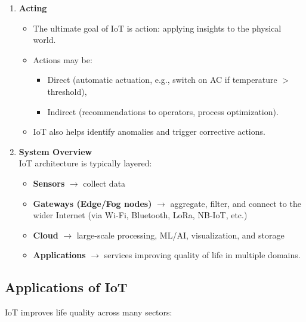 \begin{enumerate}
    \item \textbf{Acting}
    
    \begin{itemize}
        \item The ultimate goal of IoT is action: applying insights to the physical world.
        
        \item Actions may be:
        
        \begin{itemize}
            \item Direct (automatic actuation, e.g., switch on AC if temperature $>$ threshold),
            
            \item Indirect (recommendations to operators, process optimization).
        \end{itemize}
        
        \item IoT also helps identify anomalies and trigger corrective actions.
    \end{itemize}
    
    \item \textbf{System Overview}\\
    IoT architecture is typically layered:
    
    \begin{itemize}
        \item \textbf{Sensors} $\rightarrow$ collect data
        
        \item \textbf{Gateways (Edge/Fog nodes)} $\rightarrow$ aggregate, filter, and connect to the wider Internet (via Wi-Fi, Bluetooth, LoRa, NB-IoT, etc.)
        
        \item \textbf{Cloud} $\rightarrow$ large-scale processing, ML/AI, visualization, and storage
        
        \item \textbf{Applications} $\rightarrow$ services improving quality of life in multiple domains.
    \end{itemize}
\end{enumerate}

\subsection{Applications of IoT}

IoT improves life quality across many sectors:

